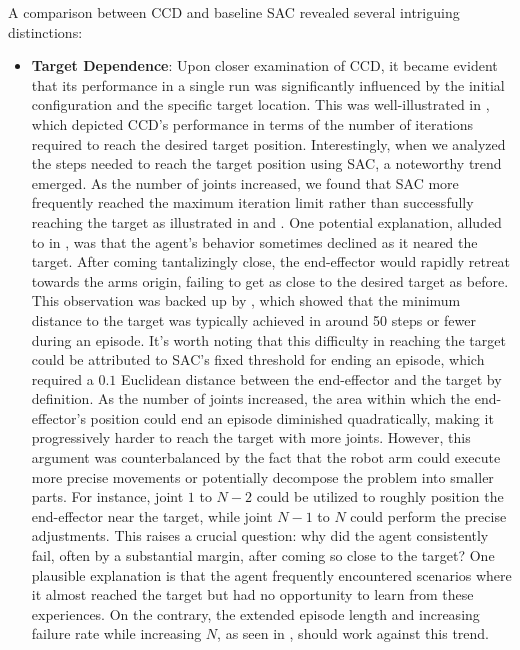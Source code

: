 A comparison between CCD and baseline SAC revealed several intriguing distinctions:

\begin{itemize}
    \item \textbf{Target Dependence}: Upon closer examination of CCD, it became evident that its performance in a single run was significantly influenced by the initial configuration and the specific target location. This was well-illustrated in  , which depicted CCD's performance in terms of the number of iterations required to reach the desired target position. Interestingly, when we analyzed the steps needed to reach the target position using SAC, a noteworthy trend emerged. As the number of joints increased, we found that SAC more frequently reached the maximum iteration limit rather than successfully reaching the target as illustrated in  and . One potential explanation, alluded to in , was that the agent's behavior sometimes declined as it neared the target. After coming tantalizingly close, the end-effector would rapidly retreat towards the arms  origin, failing to get as close to the desired target as before. This observation was backed up by , which showed that the minimum distance to the target was typically achieved in around 50 steps or fewer during an episode. It's worth noting that this difficulty in reaching the target could be attributed to SAC's fixed threshold for ending an episode, which required a $0.1$ Euclidean distance between the end-effector and the target by definition. As the number of joints increased, the area within which the end-effector's position could end an episode diminished quadratically, making it progressively harder to reach the target with more joints. However, this argument was counterbalanced by the fact that the robot arm could execute more precise movements or potentially decompose the problem into smaller parts. For instance, joint $1$ to $N-2$ could be utilized to roughly position the end-effector near the target, while joint $N-1$ to $N$ could perform the precise adjustments. This raises a crucial question: why did the agent consistently fail, often by a substantial margin, after coming so close to the target? One plausible explanation is that the agent frequently encountered scenarios where it almost reached the target but had no opportunity to learn from these experiences. On the contrary, the extended episode length and increasing failure rate while increasing $N$, as seen in  , should work against this trend.

\end{itemize}

